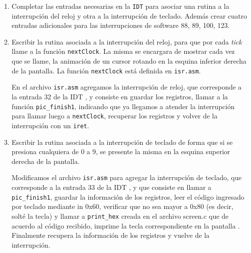 \documentclass[a4paper]{article}
\begin{document}
 \begin{enumerate}[label=\alph*)]
 	\item Completar las entradas necesarias en la \texttt{IDT} para asociar una rutina a la interrupción del reloj y otra a la interrupción de teclado. Además crear cuatro entradas adicionales para las interrupciones de software 88, 89, 100, 123.
 	
 	
 	
 	
 	\item Escribir la rutina asociada a la interrupción del reloj, para que por cada \textit{tick} llame a la función \texttt{nextClock}. La misma se encargara de mostrar cada vez que se llame, la animación	de un cursor rotando en la esquina inferior derecha de la pantalla. La función \texttt{nextClock} está definida en \texttt{isr.asm}.
 	
 	En el archivo \texttt{isr.asm} agregamos la interrupción de reloj, que corresponde a la entrada 32 de la IDT , y consiste en guardar los registros, llamar a la función \texttt{pic\_finish1}, indicando que ya	llegamos a atender la interrupción para llamar luego a \texttt{nextClock}, recuperar los registros y volver de la interrupción con un \texttt{iret}.
 	
 	\item Escribir la rutina asociada a la interrupción de teclado de forma que si se presiona cualquiera de 0 a 9, se presente la misma en la esquina superior derecha de la pantalla.
 	
 	
 	Modificamos el archivo \texttt{isr.asm} para agregar la interrupci\'on de teclado, que corresponde a la entrada 33 de la IDT , y que consiste en llamar a \texttt{pic\_finish1}, guardar la información de los registros, leer el c\'odigo ingresado por teclado mediante in 0x60, verificar que no sea mayor a 0x80 (es decir, solt\'e la tecla) y llamar a \texttt{print\_hex} creada en el archivo screen.c que de acuerdo al código recibido, imprime la tecla correspondiente en la pantalla . Finalmente recupera la información de los registros y vuelve de la interrupción.
 	

\end{enumerate}
\end{document}
